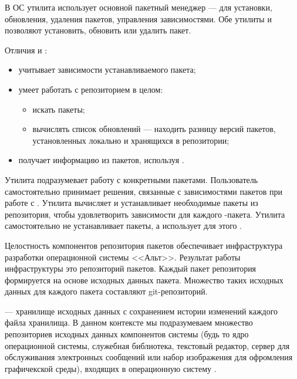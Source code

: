В ОС  утилита  использует основной пакетный менеджер  --- 
 для установки, обновления, удаления пакетов, управления зависимостями. Обе
утилиты  и  позволяют установить, обновить или удалить пакет.

Отличия  и :
\begin{itemize}
	\item {} учитывает зависимости устанавливаемого пакета;
	\item {} умеет работать с репозиторием в целом:
	\begin{itemize}
		\item искать пакеты;
		\item вычислять список обновлений --- находить разницу версий пакетов, 
		установленных локально и хранящихся в репозитории;
	\end{itemize}
	\item {} получает информацию из пакетов, используя .
\end{itemize}

Утилита  подразумевает работу с конкретными пакетами. Пользователь самостоятельно
принимает решения, связанные с зависимостями пакетов  при работе с . Утилита 
вычисляет и устанавливает необходимые пакеты из репозитория, чтобы удовлетворить зависимости для
каждого -пакета. Утилита  самостоятельно не устанавливает пакеты, а использует для этого .


Целостность компонентов репозитория пакетов обеспечивает инфраструктура разработки операционной системы <<Альт>>.
Результат работы инфраструктуры это репозиторий пакетов. Каждый пакет репозитория формируется на
основе исходных данных пакета. Множество таких исходных данных для каждого пакета составляют git-репозиторий.

 --- хранилище исходных данных с сохранением истории изменений каждого файла
хранилища. В данном контексте мы подразумеваем множество репозиториев исходных данных компонентов
системы (будь то ядро операционной системы, служебная библиотека, текстовый редактор, сервер для обслуживания
электронных сообщений или набор изображения для офромления графичекской среды), входящих в операционную
систему .

